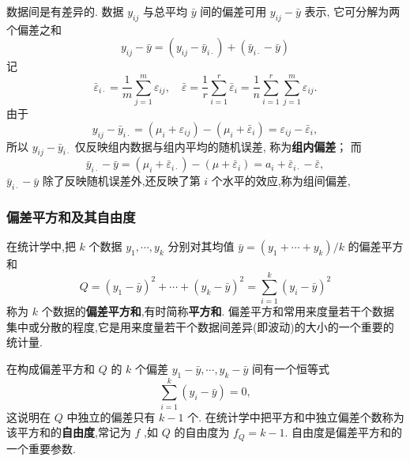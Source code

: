 数据间是有差异的. 数据 $y_{ij}$ 与总平均 $\bar{y}$ 间的偏差可用 $y_{ij} - \bar{y}$ 表示, 它可分解为两个偏差之和
\begin{equation}\label{eq:8.1.10}
  y_{ij}-\bar{y}=(y_{ij}-\bar{y}_{i\cdot})+(\bar{y}_{i\cdot}-\bar{y})
\end{equation}
记
\begin{equation*}
  \bar{\varepsilon}_{i\cdot} =\frac{1}{m} \sum_{j=1}^{m} \varepsilon_{ij}, \quad \bar{\varepsilon}=\frac{1}{r} \sum_{i=1}^{r} \bar{\varepsilon}_{i} = \frac{1}{n} \sum_{i=1}^{r} \sum_{j=1}^{m} \varepsilon_{ij}.
\end{equation*}
由于
\begin{equation}\label{eq:8.1.11}
  y_{i j}-\bar{y}_{i\cdot}=(\mu_{i}+\varepsilon_{i j})-(\mu_{i}+\bar{\varepsilon}_{i})=\varepsilon_{i j}-\bar{\varepsilon}_{i},
\end{equation}
所以 $y_{ij} - \bar{y}_{i\cdot}$ 仅反映组内数据与组内平均的随机误差, 称为\textbf{组内偏差}； 而
\begin{equation}\label{eq:8.1.12}
  \bar{y}_{i\cdot}-\bar{y} = (\mu_{i}+ \bar{\varepsilon}_{i\cdot})-(\mu +\bar{\varepsilon}_{i})= a_i + \bar{\varepsilon}_{i\cdot}-\bar{\varepsilon},
\end{equation}
$\bar{y}_{i\cdot} - \bar{y}$ 除了反映随机误差外,还反映了第 $i$ 个水平的效应,称为组间偏差,

\subsubsection{偏差平方和及其自由度}

在统计学中,把 $k$ 个数据 $y_1,\cdots,y_k$ 分别对其均值 $\bar{y}=(y_1+\cdots+y_{k}) / k$ 的偏差平方和
\begin{equation*}
  Q=\left(y_{1}-\bar{y}\right)^{2}+\cdots+\left(y_{k}-\bar{y}\right)^{2}=\sum_{i=1}^{k}\left(y_{i}-\bar{y}\right)^{2}
\end{equation*}
称为 $k$ 个数据的\textbf{偏差平方和},有时简称\textbf{平方和}. 偏差平方和常用来度量若干个数据集中或分散的程度,它是用来度量若干个数据间差异(即波动)的大小的一个重要的统计量.

在构成偏差平方和 $Q$ 的 $k$ 个偏差 $y_1 - \bar{y}, \cdots, y_{k} - \bar{y}$ 间有一个恒等式
\begin{equation*}
  \sum_{i=1}^{k}\left(y_{i}-\bar{y}\right)=0,
\end{equation*}
这说明在 $Q$ 中独立的偏差只有 $k-1$ 个. 在统计学中把平方和中独立偏差个数称为该平方和的\textbf{自由度},常记为 $f$ ,如 $Q$ 的自由度为 $f_{Q}=k-1$. 自由度是偏差平方和的一个重要参数.

